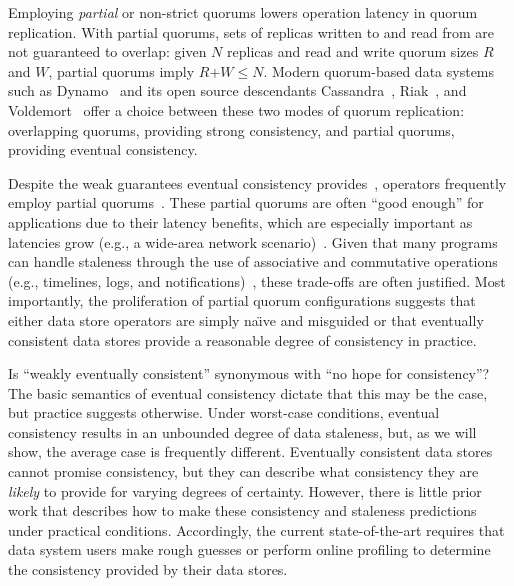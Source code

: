 \documentclass{vldb}
\begin{document}
Employing \textit{partial} or non-strict quorums lowers operation
latency in quorum replication.  With partial quorums, sets of replicas
written to and read from are not guaranteed to overlap: given $N$
replicas and read and write quorum sizes $R$ and $W$, partial quorums
imply $R$$+$$W$$\leq$$N$.  Modern quorum-based data systems such as
Dynamo~\cite{dynamo} and its open source descendants
Cassandra~\cite{cassandra}, Riak~\cite{riak}, and
Voldemort~\cite{voldemort} offer a choice between these two modes of
quorum replication: overlapping quorums, providing strong consistency,
and partial quorums, providing eventual consistency.

Despite the weak guarantees eventual consistency
provides~\cite{hamilton-cap, cops, walter}, operators frequently
employ partial quorums~\cite{cassandra, cassandra-docs,
  cassandradefault,feinbergpc,reddit, outbrain, maxperfblog}.  These
partial quorums are often ``good enough'' for applications due to
their latency benefits, which are especially important as latencies
grow (e.g., a wide-area network scenario)~\cite{abadilatconsist,
  feinbergpc}.  Given that many programs can handle staleness through
the use of associative and commutative operations (e.g., timelines,
logs, and notifications)~\cite{calm, helland}, these trade-offs are
often justified.  Most importantly, the proliferation of partial
quorum configurations suggests that either data store operators are
simply na\"{\i}ve and misguided or that eventually consistent data
stores provide a reasonable degree of consistency in practice.

Is ``weakly eventually consistent'' synonymous with ``no hope for
consistency''? The basic semantics of eventual consistency dictate
that this may be the case, but practice suggests otherwise. Under
worst-case conditions, eventual consistency results in an unbounded
degree of data staleness, but, as we will show, the average case is
frequently different.  Eventually consistent data stores cannot
promise consistency, but they can describe what consistency they are
\textit{likely} to provide for varying degrees of certainty.  However,
there is little prior work that describes how to make these
consistency and staleness predictions under practical conditions.
Accordingly, the current state-of-the-art requires that data system
users make rough guesses or perform online profiling to determine the
consistency provided by their data stores.
\end{document}
